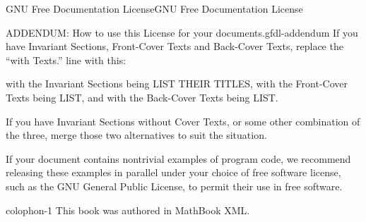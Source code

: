 \documentclass[10pt,]{book}
\numberwithin{equation}{section}
\begin{document}
\begin{appendixptx}{GNU Free Documentation License}{}{GNU Free Documentation License}{}{}
\begin{paragraphs}{ADDENDUM: How to use this License for your documents.}{gfdl-addendum}
\hypertarget{p-582}{}%
If you have Invariant Sections, Front-Cover Texts and Back-Cover Texts, replace the ``with\textellipsis{} Texts.'' line with this:%
\begin{preformatted}
with the Invariant Sections being LIST THEIR TITLES, with the
Front-Cover Texts being LIST, and with the Back-Cover Texts being LIST.
\end{preformatted}
\hypertarget{p-583}{}%
If you have Invariant Sections without Cover Texts, or some other combination of the three, merge those two alternatives to suit the situation.%
\par
\hypertarget{p-584}{}%
If your document contains nontrivial examples of program code, we recommend releasing these examples in parallel under your choice of free software license, such as the GNU General Public License, to permit their use in free software.%
\end{paragraphs}%
\end{appendixptx}
%
\backmatter
%
%
\printindex
%
\cleardoublepage
\pagestyle{empty}
\begin{backcolophon}{colophon-1}%
\hypertarget{p-585}{}%
This book was authored in MathBook XML.%
\end{backcolophon}%
\end{document}
